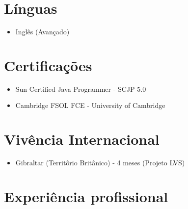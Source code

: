 \documentclass[letterpaper]{article}
\begin{document}
\section*{Línguas}
\begin{itemize}
  \item Inglês (Avançado)
\end{itemize}

\section*{Certificações}
\begin{itemize}
  \item Sun Certified Java Programmer - SCJP 5.0
  \item Cambridge FSOL FCE - University of Cambridge
\end{itemize}

\section*{Vivência Internacional}
\begin{itemize}
  \item Gibraltar (Territôrio Britânico) - 4 meses (Projeto LVS)
\end{itemize}

\section*{Experiência profissional}
\end{document}
